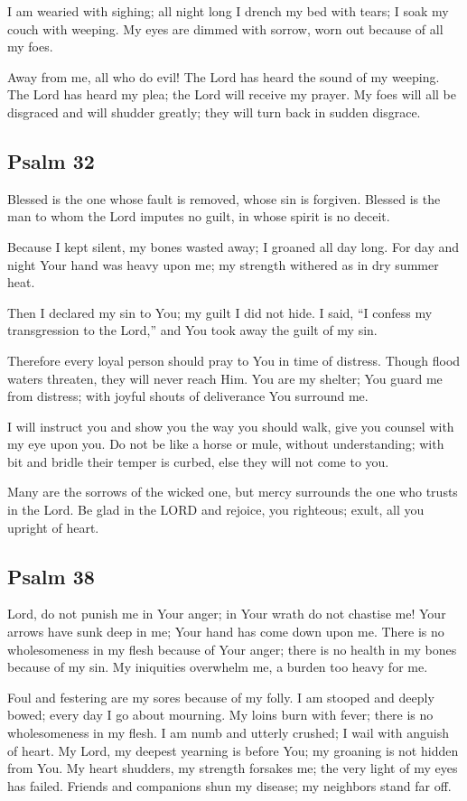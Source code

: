 \documentclass[12pt]{article}
\newcommand{\prayertitle}[1]{\subsection{#1}}
\newcommand{\indulgencedprayertitle}[1]{\prayertitle{#1 \protect\kreuz}}
\begin{document}
I am wearied with sighing;
all night long I drench my bed with tears;
I soak my couch with weeping.
My eyes are dimmed with sorrow, worn out because of all my foes.

Away from me, all who do evil!
The Lord has heard the sound of my weeping.
The Lord has heard my plea;
the Lord will receive my prayer.
My foes will all be disgraced and will shudder greatly;
they will turn back in sudden disgrace.

\indulgencedprayertitle{Psalm 32}
Blessed is the one whose fault is removed, whose sin is forgiven.
Blessed is the man to whom the Lord imputes no guilt, in whose spirit is no deceit.

Because I kept silent, my bones wasted away;
I groaned all day long.
For day and night Your hand was heavy upon me;
my strength withered as in dry summer heat.

Then I declared my sin to You;
my guilt I did not hide.
I said, ``I confess my transgression to the Lord,'' and You took away the guilt of my sin.

Therefore every loyal person should pray to You in time of distress.
Though flood waters threaten, they will never reach Him.
You are my shelter; You guard me from distress;
with joyful shouts of deliverance You surround me.

I will instruct you and show you the way you should walk, give you counsel with my eye upon you.
Do not be like a horse or mule, without understanding;
with bit and bridle their temper is curbed, else they will not come to you.

Many are the sorrows of the wicked one, but mercy surrounds the one who trusts in the Lord.
Be glad in the LORD and rejoice, you righteous;
exult, all you upright of heart.

\indulgencedprayertitle{Psalm 38}
Lord, do not punish me in Your anger;
in Your wrath do not chastise me!
Your arrows have sunk deep in me;
Your hand has come down upon me.
There is no wholesomeness in my flesh because of Your anger;
there is no health in my bones because of my sin.
My iniquities overwhelm me, a burden too heavy for me.

Foul and festering are my sores because of my folly.
I am stooped and deeply bowed;
every day I go about mourning.
My loins burn with fever;
there is no wholesomeness in my flesh.
I am numb and utterly crushed;
I wail with anguish of heart.
My Lord, my deepest yearning is before You;
my groaning is not hidden from You.
My heart shudders, my strength forsakes me;
the very light of my eyes has failed.
Friends and companions shun my disease;
my neighbors stand far off.
\end{document}
